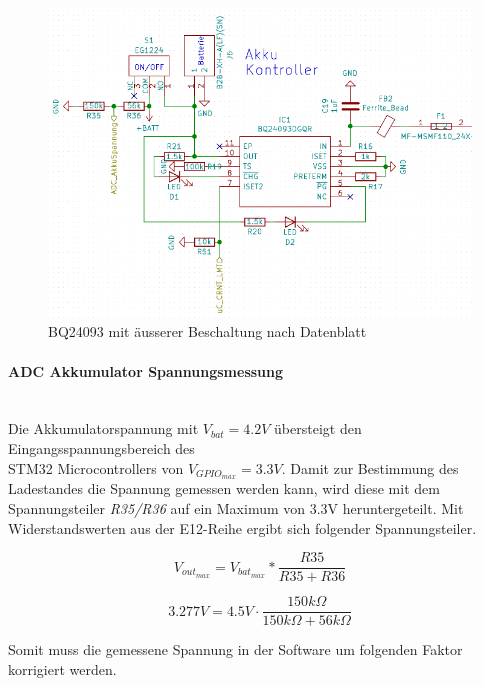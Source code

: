 \begin{figure} [H]
\begin{center}
\includegraphics[width=\textwidth]{../graphics/Schema_Akku.png}
\caption{BQ24093 mit äusserer Beschaltung nach Datenblatt}
\label{fig:Schema_Akku}
\end{center}
\end{figure}

\paragraph{ADC Akkumulator Spannungsmessung}\vspace{-0.3cm}\\
Die Akkumulatorspannung mit ${V_{bat}=4.2\si{V}}$ übersteigt den Eingangsspannungsbereich des\\
 STM32 Microcontrollers von ${V_{GPIO_{max}}=3.3\si{V}}$.
Damit zur Bestimmung des Ladestandes die Spannung gemessen werden kann, wird diese mit dem Spannungsteiler \textit{R35/R36} auf ein Maximum von 3.3\si{V} heruntergeteilt. 
Mit Widerstandswerten aus der E12-Reihe ergibt sich folgender Spannungsteiler.

\begin{equation}
V_{out_{max}} = V_{bat_{max}}*\frac{R35}{R35+R36}
\end{equation}

\begin{equation}
3.277\si{V} = 4.5\si{V}\cdot \frac{150\si{k\Omega}}{150\si{k\Omega}+56\si{k\Omega}}
\end{equation}

Somit muss die gemessene Spannung in der Software um folgenden Faktor korrigiert werden.

